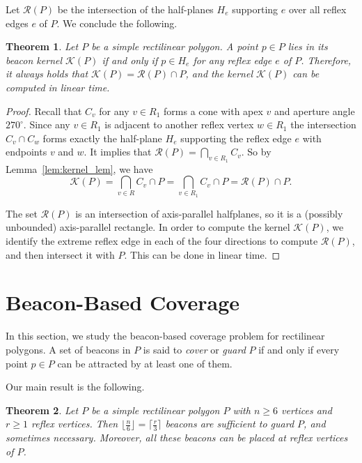 \documentclass[11pt]{article}
\newcommand{\Kernel}{\mathcal{K}}
\newcommand{\RKernel}{\mathcal{R}}
\newtheorem{theorem}{Theorem}
\theoremstyle{definition}
\let\geq\geqslant
\begin{document}
Let $\RKernel(P)$ be the intersection of the half-planes $H_e$ supporting $e$
over all reflex edges $e$ of $P$. We conclude the following.
\begin{theorem} \label{thm:kernel}
 Let $P$ be a simple rectilinear polygon.
 A point $p \in P$ lies in its beacon kernel $\Kernel(P)$ if and only if
 $p \in H_e$ for any reflex edge $e$ of $P$.
 Therefore, it always holds that $\Kernel(P) = \RKernel(P) \cap P$, and
 the kernel $\Kernel(P)$ can be computed in linear time.
\end{theorem}
\begin{proof}
Recall that $C_v$ for any $v\in R_1$ forms a cone with apex $v$ and aperture angle $270^\circ$.
Since any $v\in R_1$ is adjacent to another reflex vertex $w\in R_1$
the intersection $C_v \cap C_w$ forms exactly the half-plane $H_e$ supporting the reflex edge $e$
with endpoints $v$ and $w$.
It implies that $\RKernel(P) = \bigcap_{v\in R_1} C_v$.
So by Lemma~\ref{lem:kernel_lem}, we have
\[ \Kernel(P) = \bigcap_{v \in R} C_v \cap P = \bigcap_{v \in R_1} C_v \cap P = \RKernel(P) \cap P.\]

The set $\RKernel(P)$ is an intersection of axis-parallel halfplanes,
so it is a (possibly unbounded) axis-parallel rectangle.
In order to compute the kernel $\Kernel(P)$,
we identify the extreme reflex edge in each of the four directions to compute $\RKernel(P)$,
and then intersect it with $P$.
This can be done in linear time.
\end{proof}

\section{Beacon-Based Coverage} \label{sec:coverage}


In this section, we study the beacon-based coverage problem for rectilinear polygons.
A set of beacons in $P$ is said to \emph{cover} or \emph{guard} $P$
if and only if every point $p\in P$ can be attracted by at least one of them.

Our main result is the following. 
\begin{theorem} \label{thm:covering}
 Let $P$ be a simple rectilinear polygon $P$ with $n \geq 6$ vertices and
 $r \geq 1$ reflex vertices.
 Then $\lfloor \frac{n}{6}\rfloor = \lceil \frac{r}{3} \rceil$ beacons are sufficient
 to guard $P$, and sometimes necessary.
 Moreover, all these beacons can be placed at reflex vertices of $P$.
\end{theorem}
\end{document}
